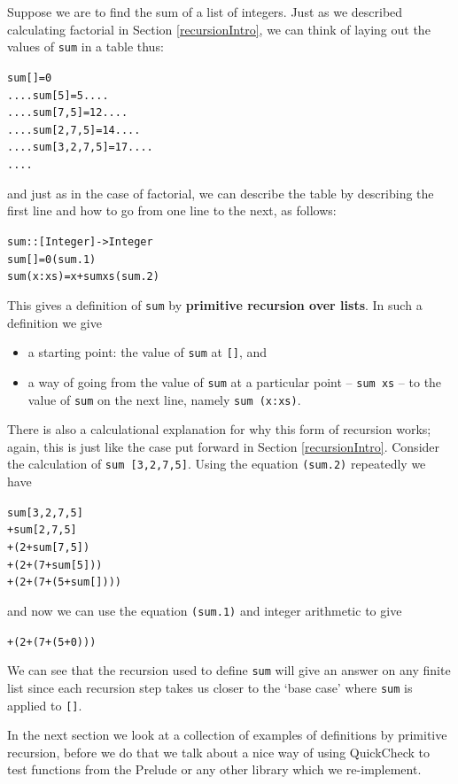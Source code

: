 Suppose we are to find the sum of a list of integers. Just as we
described calculating factorial in Section \ref{recursionIntro}, we can
think of laying out the values of \texttt{sum} in a table
thus:
\begin{alltt}
         sum [] = 0
 ....    sum [5] = 5    .... 
 ....    sum [7,5] = 12    ....
 ....    sum [2,7,5] = 14     ....
 ....    sum [3,2,7,5] = 17      ....
 ....
\end{alltt}
and just as in the case of factorial, we can describe the table by describing the first line
and how to go from one line to the next, as follows:
\begin{alltt}
sum :: [Integer] -> Integer
sum []     = 0\hfill(sum.1)
sum (x:xs) = x + sum xs\hfill(sum.2)
\end{alltt}
This gives a definition of \texttt{sum} by \textbf{primitive recursion
over lists}. In such a definition we give
\begin{itemize}
\item a starting point: the value of \texttt{sum} at \texttt{[]}, and
\item a way of going from the value of \texttt{sum} at a particular
point -- \texttt{sum xs} -- to the value of \texttt{sum} on the next
line, namely \texttt{sum (x:xs)}.
\end{itemize}
There is also a calculational explanation for why this form of recursion
works; again, this is just like the case put forward in Section
\ref{recursionIntro}.
Consider the calculation of \texttt{sum [3,2,7,5]}. Using the equation
\texttt{(sum.2)} repeatedly we have
\begin{alltt}
sum [3,2,7,5]
 + sum [2,7,5]
 + (2 + sum [7,5])
 + (2 + (7 + sum [5]))
 + (2 + (7 + (5 + sum [])))
\end{alltt}
and now we can use the equation
\texttt{(sum.1)} and integer arithmetic to give
\begin{alltt}
 + (2 + (7 + (5 + 0)))
\end{alltt}
We can see that the recursion used to define \texttt{sum} will give an
answer on any finite list since each recursion step takes us closer to the `base
case' where \texttt{sum} is applied to \texttt{[]}.

In the next section we look at a collection of examples of definitions
by primitive recursion, before we do that we talk about a nice way of using QuickCheck to test functions from the Prelude or any other library which we re-implement.

